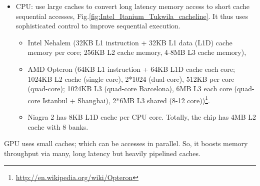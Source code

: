   \begin{itemize}
  \item CPU: use large caches to convert long latency memory access to
    short cache sequential accesses,
    Fig.\ref{fig:Intel_Itanium_Tukwila_cacheline}. It thus uses sophisticated
    control to improve sequential execution.
    \begin{itemize}
    \item Intel Nehalem (32KB L1 instruction + 32KB L1 data (L1D)
      cache memory per core; 256KB L2 cache memory, 4-8MB L3 cache
      memory),
    \item AMD Opteron (64KB L1 instruction + 64KB L1D cache each core;
      1024KB L2 cache (single core), 2*1024 (dual-core), 512KB per
      core (quad-core); 1024KB L3 (quad-core Barcelona), 6MB L3 each
      core (quad-core Istanbul + Shanghai), 2*6MB L3 shared (8-12
      core))\footnote{\url{http://en.wikipedia.org/wiki/Opteron}}.
    \item Niagra 2 has 8KB L1D cache per CPU core. Totally, the chip
      has 4MB L2 cache with 8 banks.
    \end{itemize}
  \end{itemize}
  GPU uses small caches; which can be accesses in parallel. So, it
  boosts memory throughput via many, long latency but heavily
  pipelined caches.

